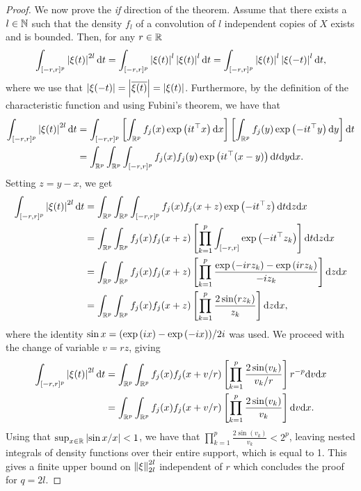 \begin{proof}
    We now prove the \textit{if} direction of the theorem. Assume that there exists a $l \in \N$ such that the density $f_l$ of a convolution of $l$ independent copies of $X$ exists and is bounded. Then, for any $r \in \R$
    \begin{equation*}
        \int_{[-r, r]^p} \abs{\xi(t)}^{2l} \d t
        = \int_{[-r, r]^p} \abs{\xi(t)}^l\abs{\xi(t)}^l \d t
        = \int_{[-r, r]^p} \abs{\xi(t)}^l\abs{\xi(-t)}^l \d t,
    \end{equation*}
    where we use that $\abs{\xi(-t)} = \abs{\overline{\xi(t)}} = \abs{\xi(t)}$. Furthermore, by the definition of the characteristic function and using Fubini's theorem, we have that
    \begin{align*}
        \int_{[-r, r]^p} \abs{\xi(t)}^{2l} \d t
        &= \int_{[-r, r]^p} \left[\intRp{x}{f_j(x)\expf{it^\top x}}\right]\left[\intRp{y}{f_j(y)\expf{-it^\top y}}\right] \d t\\
        &= \intRp{x}{\intRp{y}{\int_{[-r, r]^p} f_j(x)f_j(y)\expf{it^\top (x - y)}\d t}}.
    \end{align*}
    Setting $z = y - x$, we get
    \begin{align*}
        \int_{[-r, r]^p} \abs{\xi(t)}^{2l} \d t
        &= \intRp{x}{\intRp{z}{\int_{[-r, r]^p} f_j(x)f_j(x + z)\expf{-it^\top z}\d t}}\\
        &= \intRp{x}{\intRp{z}{f_j(x)f_j(x + z)\left[\prod_{k=1}^p \int_{[-r, r]}\expf{-it^\top z_k}\right]\d t}}\\
        &= \intRp{x}{\intRp{z}{f_j(x)f_j(x + z)\left[\prod_{k=1}^p \frac{\expf{-irz_k} - \expf{irz_k}}{-iz_k} \right]}}\\
        &= \intRp{x}{\intRp{z}{f_j(x)f_j(x + z)\left[\prod_{k=1}^p \frac{2 \sin(rz_k)}{z_k} \right]}},
    \end{align*}
    where the identity $\sin x = (\expf{ix} - \expf{-ix}) / 2i$ was used. We proceed with the change of variable $v = r z$, giving
    \begin{align*}
        \int_{[-r, r]^p} \abs{\xi(t)}^{2l} \d t
        &= \intRp{x}{\intRp{v}{f_j(x)f_j(x + v/r)\left[\prod_{k=1}^p \frac{2 \sin(v_k)}{v_k/r} \right] r^{-p}}}\\
        &= \intRp{x}{\intRp{v}{f_j(x)f_j(x + v/r)\left[\prod_{k=1}^p \frac{2 \sin(v_k)}{v_k} \right]}}.
    \end{align*}
    Using that $\sup_{x \in \R} \abs{\sin x / x} < 1$, we have that $\prod_{k=1}^p \frac{2 \sin(v_k)}{v_k} < 2^p$, leaving nested integrals of density functions over their entire support, which is equal to 1. This gives a finite upper bound on $\norm{\xi}_{2l}^{2l}$ independent of $r$ which concludes the proof for $q = 2l$.
\end{proof}